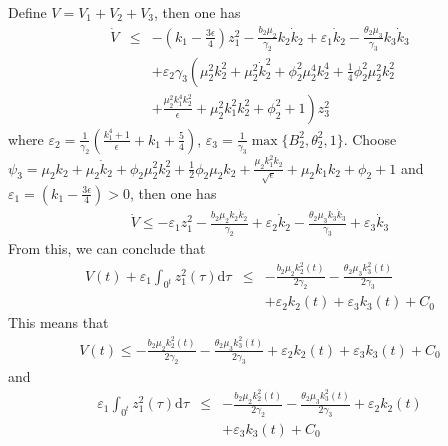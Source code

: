 \documentclass{tSYS2e}
\theoremstyle{plain}
\theoremstyle{definition}
\begin{document}
Define $V=V_1+V_2+V_3$, then one has
\begin{eqnarray*}
\dot{V} &\leq &-\left( k_{1}-\frac{3\epsilon }{4}\right) z_{1}^{2}-\frac{
b_{2}\mu _{2}}{\gamma _{2}}k_{2}\dot{k}_{2}+\varepsilon _{1}\dot{k}_{2}-
\frac{\theta _{2}\mu _{3}}{\gamma _{3}}k_{3}\dot{k}_{3} \\
&&+\varepsilon _{2}\gamma_3\left( \mu _{2}^{2}k_{2}^{2}+\mu _{2}^{2}\dot{k}
_{2}^{2}+\phi _{2}^{2}\mu _{2}^{4}k_{2}^{4}+\frac{1}{4}\phi _{2}^{2}\mu
_{2}^{2}k_{2}^{2}\right.  \\
&&+\left. \frac{\mu _{2}^{2}k_{1}^{4}k_{2}^{2}}{\epsilon }+\mu
_{2}^{2}k_{1}^{2}k_{2}^{2}+\phi _{2}^{2}+1\right) z_{3}^{2}
\end{eqnarray*}
where $\varepsilon_{2}=\frac{1}{\gamma _{2}}\left( \frac{k_{1}^{4}+1}{\epsilon }+k_{1}+\frac{5}{4}\right)$,  $\varepsilon _{3}=\frac{1}{\gamma_3}\max \{B_{2}^{2},\theta _{2}^{2},1\}$. Choose $\psi _{3}=\mu _{2}k_{2}+\mu _{2}\dot{k}_{2}+\phi _{2}\mu
_{2}^{2}k_{2}^{2}+\frac{1}{2}\phi _{2}\mu _{2}k_{2}+\frac{\mu
_{2}k_{1}^{2}k_{2}}{\sqrt{\epsilon }}+\mu _{2}k_{1}k_{2}+\phi _{2}+1$ and $\varepsilon_1=\left(k_{1}-\frac{3\epsilon }{4}\right)>0$, then one has
\begin{eqnarray*}
\dot{V}\leq -\varepsilon_1z_{1}^{2}-\frac{
b_{2}\mu _{2}k_{2}\dot{k}_{2}}{\gamma _{2}}+\varepsilon _{2}\dot{k}_{2}-
\frac{\theta _{2}\mu _{3}k_{3}\dot{k}_{3}}{\gamma _{3}}+\varepsilon _{3}\dot{k}_{3}
\end{eqnarray*}
From this, we can conclude that
\begin{eqnarray*}
V(t)+\varepsilon _{1}\int_{0}\nolimits^{t}z_{1}^{2}(\tau )\mathrm{d}\tau &\leq& -\frac{b_{2}\mu _{2}k_{2}^{2}(t)}{2\gamma _{2}}-\frac{\theta _{2}\mu
_{3}k_{3}^{2}(t)}{2\gamma _{3}}\nonumber\\
&&+\varepsilon _{2}k_{2}(t)+\varepsilon
_{3}k_{3}(t)+C_{0}
\end{eqnarray*}
This means that
\begin{eqnarray*}
V(t)\leq -\frac{
b_{2}\mu _{2}k_{2}^{2}(t)}{2\gamma _{2}}-\frac{\theta _{2}\mu
_{3}k_{3}^{2}(t)}{2\gamma _{3}}+\varepsilon _{2}k_{2}(t)+\varepsilon
_{3}k_{3}(t)+C_{0}
\end{eqnarray*}
and
\begin{eqnarray*}
\varepsilon _{1}\int_{0}\nolimits^{t}z_{1}^{2}(\tau )\mathrm{d}\tau &\leq& -\frac{
b_{2}\mu _{2}k_{2}^{2}(t)}{2\gamma _{2}}-\frac{\theta _{2}\mu
_{3}k_{3}^{2}(t)}{2\gamma _{3}}+\varepsilon _{2}k_{2}(t)\nonumber\\
&&+\varepsilon_{3}k_{3}(t)+C_{0}
\end{eqnarray*}
\end{document}
